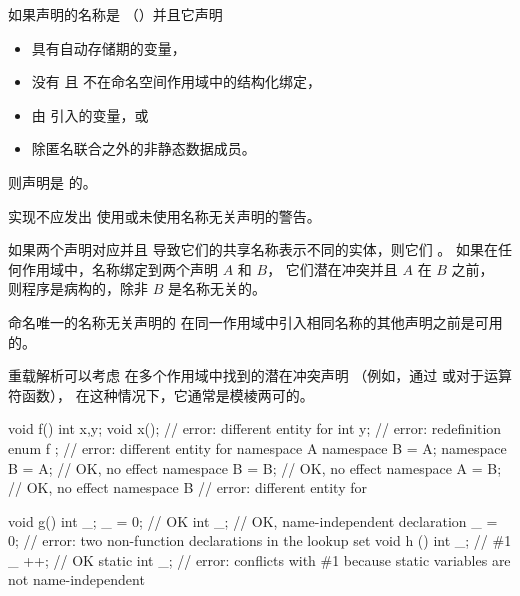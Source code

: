 \pnum
如果声明的名称是 \tcode{_}（）并且它声明
\begin{itemize}
\item
具有自动存储期的变量，
\item
没有  且
不在命名空间作用域中的结构化绑定，
\item
由  引入的变量，或
\item
除匿名联合之外的非静态数据成员。
\end{itemize}
则声明是  的。

\recommended
实现不应发出
使用或未使用名称无关声明的警告。

\pnum
{}%
如果两个声明对应并且
导致它们的共享名称表示不同的实体，则它们 。
如果在任何作用域中，名称绑定到两个声明 $A$ 和 $B$，
它们潜在冲突并且 $A$ 在 $B$ 之前，
则程序是病构的，除非 $B$ 是名称无关的。
\begin{note}
命名唯一的名称无关声明的 
在同一作用域中引入相同名称的其他声明之前是可用的。
\end{note}
\begin{note}
重载解析可以考虑
在多个作用域中找到的潜在冲突声明
（例如，通过  或对于运算符函数），
在这种情况下，它通常是模棱两可的。
\end{note}
\begin{example}
\begin{codeblock}
void f() {
  int x,y;
  void x();             // error: different entity for 
  int y;                // error: redefinition
}
enum { f };             // error: different entity for 
namespace A {}
namespace B = A;
namespace B = A;        // OK, no effect
namespace B = B;        // OK, no effect
namespace A = B;        // OK, no effect
namespace B {}          // error: different entity for 

void g() {
  int _;
  _ = 0;                // OK
  int _;                // OK, name-independent declaration
  _ = 0;                // error: two non-function declarations in the lookup set
}
void h () {
  int _;                // \#1
  _ ++;                 // OK
  static int _;         // error: conflicts with \#1 because static variables are not name-independent
}
\end{codeblock}
\end{example}

